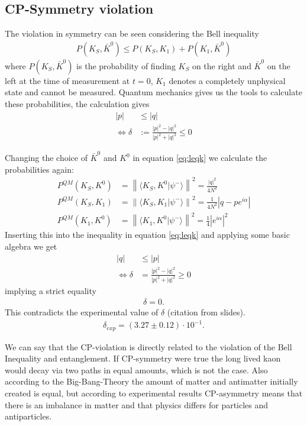 \documentclass[a4paper]{article}
\begin{document}
\subsection{CP-Symmetry violation}
The violation in symmetry can be seen considering the Bell inequality
\begin{align}\label{eq:leqk}
    P(K_S, \bar{K}^0) \leq P(K_S, K_1) + P(K_1, \bar{K}^0)
\end{align}
where $P(K_S, \bar{K}^0)$ is the probability of finding $K_S$ on the right and
$\bar{K}^0$ on the left at the time of measurement at $t=0$, $K_1$ denotes a
completely unphysical state and cannot be measured. Quantum mechanics gives us
the tools to calculate these probabilities, the calculation gives
\begin{align}
    |p|&\leq |q|\\
    \Leftrightarrow \delta &:= \frac{|p|^2 - |q|^2}{|p|^2+|q|^2} \leq 0
\end{align}

Changing the choice of $\bar{K}^0$ and $K^0$ in equation \ref{eq:leqk} we
calculate the probabilities again:
\begin{align}
    P^{QM}(K_S, K^0)&=\left\|\langle K_S, K^0|\psi ^-\rangle\right\|
    ^2=\frac{|q|^2}{4N^2} \\
    P^{QM}(K_S, K_1)&= \left\|\langle K_S, K_1|\psi ^-\rangle\right\|^2=
    \frac{1}{4N^2}\left|q-pe^{i\alpha}\right|\\
    P^{QM}(K_1, K^0)&=\left\|\langle K_1, K^0|\psi ^-\rangle\right\| ^2=
    \frac{1}{4}|e^{i\alpha}|^2
\end{align}
Inserting this into the inequality in equation \ref{eq:leqk} and applying some
basic algebra we get
\begin{align}
    |q| &\leq |p|\\
    \Leftrightarrow \delta &= \frac{|p|^2 - |q|^2}{|p|^2+|q|^2} \geq 0
\end{align}
implying a strict equality
\begin{align}
        \delta = 0.
\end{align}
This contradicts the experimental value of $\delta$ (citation from slides).
\begin{align}
    \delta_{exp} = (3.27\pm 0.12)\cdot 10^{-1}.
\end{align}

We can say that the CP-violation is directly related to the violation of the
Bell Inequality and entanglement.
If CP-symmetry were true the long lived kaon would decay via two paths in equal
amounts, which is not the case. Also
according to the Big-Bang-Theory the amount
of matter and antimatter initially created is equal, but according to
experimental results CP-asymmetry means that there is an imbalance in
matter and that physics differs for particles and antiparticles.
\end{document}
